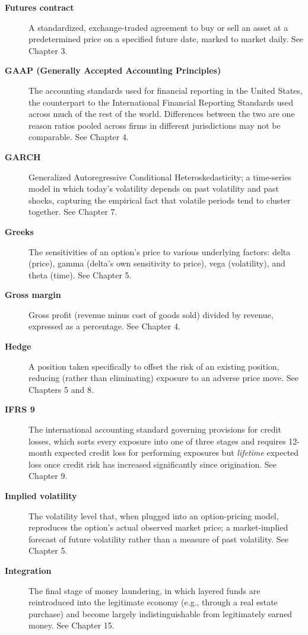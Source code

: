 \documentclass[../ai_in_finance]{subfiles}
\begin{document}
\begin{description}
\item[\textbf{Futures contract}] A standardized, exchange-traded agreement to buy or sell an asset at a predetermined price on a specified future date, marked to market daily. See Chapter 3.

\item[\textbf{GAAP (Generally Accepted Accounting Principles)}] The accounting standards used for financial reporting in the United States, the counterpart to the International Financial Reporting Standards used across much of the rest of the world. Differences between the two are one reason ratios pooled across firms in different jurisdictions may not be comparable. See Chapter 4.
\item[\textbf{GARCH}] Generalized Autoregressive Conditional Heteroskedasticity; a time-series model in which today's volatility depends on past volatility and past shocks, capturing the empirical fact that volatile periods tend to cluster together. See Chapter 7.

\item[\textbf{Greeks}] The sensitivities of an option's price to various underlying factors: delta (price), gamma (delta's own sensitivity to price), vega (volatility), and theta (time). See Chapter 5.

\item[\textbf{Gross margin}] Gross profit (revenue minus cost of goods sold) divided by revenue, expressed as a percentage. See Chapter 4.

\item[\textbf{Hedge}] A position taken specifically to offset the risk of an existing position, reducing (rather than eliminating) exposure to an adverse price move. See Chapters 5 and 8.

\item[\textbf{IFRS 9}] The international accounting standard governing provisions for credit losses, which sorts every exposure into one of three stages and requires 12-month expected credit loss for performing exposures but \emph{lifetime} expected loss once credit risk has increased significantly since origination. See Chapter 9.
\item[\textbf{Implied volatility}] The volatility level that, when plugged into an option-pricing model, reproduces the option's actual observed market price; a market-implied forecast of future volatility rather than a measure of past volatility. See Chapter 5.

\item[\textbf{Integration}] The final stage of money laundering, in which layered funds are reintroduced into the legitimate economy (e.g., through a real estate purchase) and become largely indistinguishable from legitimately earned money. See Chapter 15.


\end{description}
\end{document}
